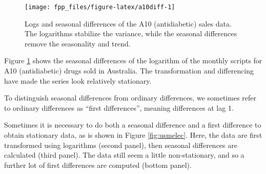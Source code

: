 \documentclass[]{book}
\newenvironment{Shaded}{\begin{snugshade}}{\end{snugshade}}
\newcommand{\CharTok}[1]{\textcolor[rgb]{0.31,0.60,0.02}{#1}}
\newcommand{\DataTypeTok}[1]{\textcolor[rgb]{0.13,0.29,0.53}{#1}}
\newcommand{\DecValTok}[1]{\textcolor[rgb]{0.00,0.00,0.81}{#1}}
\newcommand{\KeywordTok}[1]{\textcolor[rgb]{0.13,0.29,0.53}{\textbf{#1}}}
\newcommand{\NormalTok}[1]{#1}
\newcommand{\OperatorTok}[1]{\textcolor[rgb]{0.81,0.36,0.00}{\textbf{#1}}}
\newcommand{\OtherTok}[1]{\textcolor[rgb]{0.56,0.35,0.01}{#1}}
\newcommand{\StringTok}[1]{\textcolor[rgb]{0.31,0.60,0.02}{#1}}
\begin{document}
\begin{figure}

{\centering \texttt{[image: fpp\_files/figure-latex/a10diff-1]} 

}

\caption{Logs and seasonal differences of the A10 (antidiabetic) sales data. The logarithms stabilize the variance, while the seasonal differences remove the seasonality and trend.}\label{fig:a10diff}
\end{figure}

Figure \ref{fig:a10diff} shows the seasonal differences of the logarithm of the monthly scripts for A10 (antidiabetic) drugs sold in Australia. The transformation and differencing have made the series look relatively stationary.

To distinguish seasonal differences from ordinary differences, we sometimes refer to ordinary differences as ``first differences'', meaning differences at lag 1.

Sometimes it is necessary to do both a seasonal difference and a first difference to obtain stationary data, as is shown in Figure \ref{fig:usmelec}. Here, the data are first transformed using logarithms (second panel), then seasonal differences are calculated (third panel). The data still seem a little non-stationary, and so a further lot of first differences are computed (bottom panel).

\begin{Shaded}
\end{Shaded}
\end{document}
